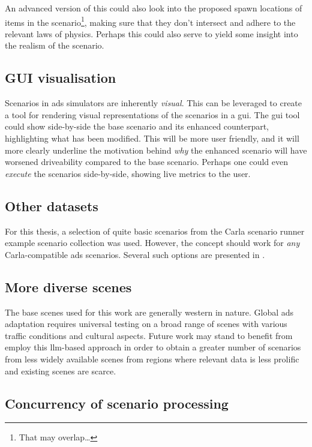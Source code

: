 An advanced version of this could also look into the proposed spawn locations of items in the
scenario\footnote{That may overlap\ldots}, making sure that they don't intersect and adhere to the
relevant laws of physics. Perhaps this could also serve to yield some insight into the realism of
the scenario.

\subsection{GUI visualisation}

Scenarios in \acrshort{ads} simulators are inherently \emph{visual}. This can be leveraged to create
a tool for rendering visual representations of the scenarios in a \acrfull{gui}. The \acrshort{gui}
tool could show side-by-side the base scenario and its enhanced counterpart, highlighting what has
been modified.
This will be more user friendly, and it will more clearly underline the motivation behind \emph{why}
the enhanced scenario will have worsened driveability compared to the base scenario.
Perhaps one could even \emph{execute} the scenarios side-by-side, showing live metrics to the user.

\subsection{Other datasets}

For this thesis, a selection of quite basic scenarios from the Carla scenario runner example
scenario collection was used. However, the concept should work for \emph{any} Carla-compatible
\acrshort{ads} scenarios. Several such options are presented in .

\subsection{More diverse scenes}
The base scenes used for this work are generally western in nature. Global \acrshort{ads} adaptation
requires universal testing on a broad range of scenes with various traffic conditions and cultural
aspects. Future work may stand to benefit from employ this \acrshort{llm}-based approach in order
to obtain a greater number of scenarios from less widely available scenes from regions where
relevant data is less prolific and existing scenes are scarce.

\subsection{Concurrency of scenario processing}


